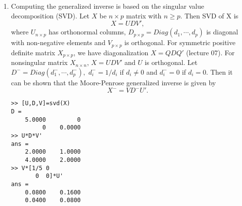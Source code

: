 \documentclass[11pt,twocolumn]{article} %
\begin{document}
\begin{enumerate}
\item Computing the generalized inverse is based on the singular
value decomposition (SVD). Let $X$ be $n \times p$ matrix with $n
\geq p$. Then SVD of X is
$$X=UDV',$$
where $U_{n \times p}$ has orthonormal columns, $D_{p \times
p}=Diag(d_1,\cdots,d_p)$ is diagonal with non-negative elements
and $V_{p \times p}$ is orthogonal. For symmetric positive
definite matrix $X_{p \times p}$, we have diagonalization $X=QDQ'$
(lecture 07). For nonsingular matrix $X_{n \times n}$, $X=UDV'$
and $U$ is orthogonal. Let $D^{-}=Diag(d_1^{-},\cdots,d_p^{-}),$
$d_i^{-} = 1/d_i$ if $d_i \neq 0$ and $d_i^{-} = 0$ if $d_i=0$.
Then it can be shown that the Moore-Penrose generalized inverse is
given by
$$X^{-}=VD^{-}U'.$$

\begin{verbatim}
>> [U,D,V]=svd(X)
D =
    5.0000         0
         0    0.0000
>> U*D*V'
ans =
    2.0000    1.0000
    4.0000    2.0000
>> V*[1/5 0
       0  0]*U'
ans =
    0.0800    0.1600
    0.0400    0.0800
\end{verbatim}
\end{enumerate}
\end{document}
